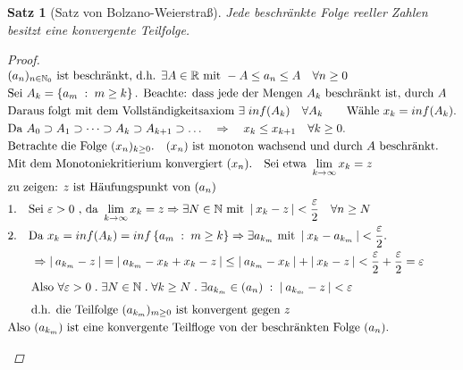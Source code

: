 \documentclass[a4paper,titlepage,oneside]{article}
\def\N{\ensuremath{\mathbb{N}} }
\def\R{\ensuremath{\mathbb{R}} }
\renewcommand{\epsilon}{\ensuremath{\varepsilon} }
\def\zz{\text{zu zeigen: }}
\def\sp{\hspace{0,1cm}}
\def\spdot{\sp.\sp}
\def\spcolon{\sp:\sp}
\renewcommand{\liminf}[2][n]{\ensuremath{\lim\limits_{#1 \rightarrow \infty}{#2}}}
\newcommand{\abs}[1]{\ensuremath{\left|\:#1\:\right|}}
\newcommand{\menge}[2]{\ensuremath{\left\{#1\sp : \sp #2\right\}}}
\theoremstyle{thmstyle}
\newtheorem{satz}{Satz}[section]
\theoremstyle{subthmstyle}
\begin{document}
\begin{satz}[Satz von Bolzano-Weierstraß]
Jede beschränkte Folge reeller Zahlen besitzt eine konvergente Teilfolge.
\begin{proof}
\begin{math} \displaystyle
\begin{aligned}[t]
&(a_n)_{n \in \N_0} \text{ ist beschränkt, d.h. }\exists A \in \R \text{ mit }-A \le a_n \le A \quad \forall n \ge 0\\
&\text{Sei } A_k = \menge{a_m}{m \ge k} \text{. Beachte: dass jede der Mengen } A_k \text{ beschränkt ist, durch }A\\
&\text{Daraus folgt mit dem Vollständigkeitsaxiom } \exists \sp inf(A_k) \quad \forall A_k \qquad \text{Wähle } x_k = inf(A_k). \\
&\text{Da } A_0 \supset A_1 \supset \dots \supset A_k \supset A_{k+1} \supset \dots \quad \Rightarrow \quad x_k \le x_{k+1} \quad \forall k \ge 0.\\
&\text{Betrachte die Folge }(x_n)_{k \ge 0}. \quad (x_n) \text{ ist monoton wachsend und durch $A$ beschränkt.}\\
&\text{Mit dem Monotoniekritierium konvergiert } (x_n). \quad \text{Sei etwa } \liminf[k]{x_k} = z\\
&\zz z \text{ ist Häufungspunkt von } (a_n) \\
&\begin{aligned}[t]
& 1. &&\text{Sei } \epsilon > 0 \text{ , da } \liminf[k]{x_k} = z \Rightarrow \exists N \in \N \text{ mit } \abs{x_k - z} < \frac{\epsilon}{2} \quad \forall n \ge N \\
& 2. &&\text{Da }x_k = inf(A_k) = inf\menge{a_m}{m \ge k} \Rightarrow \exists a_{k_m} \text{ mit } \abs{x_k - a_{k_m}} < \frac{\epsilon}{2}.
\end{aligned} \\ \vphantom{\frac{\epsilon}{2}}
&\qquad \Rightarrow \abs{a_{k_m} - z} = \abs{a_{k_m} - x_k + x_k - z} \le \abs{a_{k_m} - x_k} + \abs{x_k - z} < \frac{\epsilon}{2} + \frac{\epsilon}{2} = \epsilon  \\ \vphantom{\frac{\epsilon}{2}}
&\qquad \text{Also } \forall \epsilon > 0 \spdot \exists N \in \N \spdot \forall k \ge N \spdot \exists a_{k_m} \in (a_n) \spcolon \abs{a_{k_m} - z} < \epsilon  \\
&\qquad \text{d.h. die Teilfolge }(a_{k_m})_{m\ge 0}\text{ ist konvergent gegen } z \\
&\text{Also }(a_{k_m})\text{ ist eine konvergente Teilfloge von der beschränkten Folge }(a_n).
\end{aligned} \\
\end{math}
\begin{figure}[h!] \begin{center}  \end{center}\end{figure}
\end{proof}
\end{satz}
\end{document}
